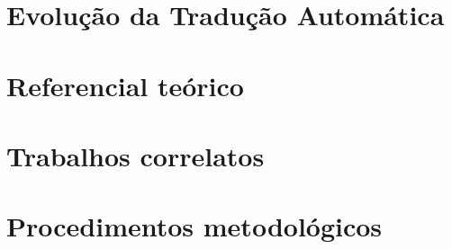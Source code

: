 \documentclass[
	11pt,				%
	openright,			%
	oneside,			%
	a4paper,			%
	english,			%
	french,				%
	spanish,			%
	brazil,				%
	]{abntex2}
\begin{document}
\chapter{Evolução da Tradução Automática}


\chapter{Referencial teórico}



\chapter{Trabalhos correlatos}


\chapter{Procedimentos metodológicos}



%

%

%

% 

%


\postextual
\end{document}
